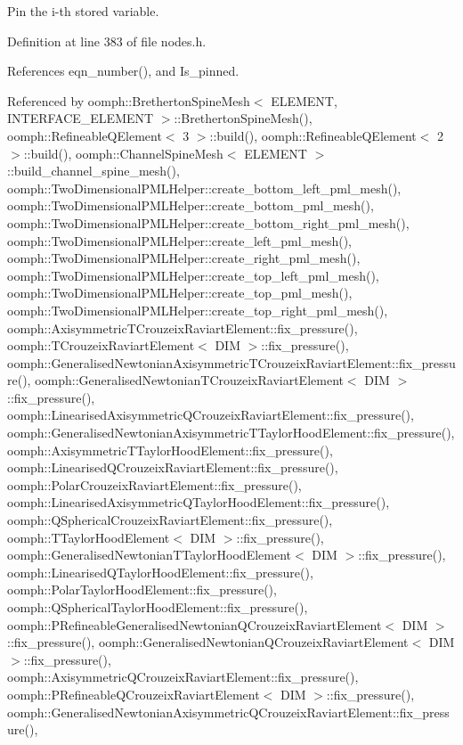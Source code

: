 Pin the i-\/th stored variable. 



Definition at line 383 of file nodes.\+h.



References eqn\+\_\+number(), and Is\+\_\+pinned.



Referenced by oomph\+::\+Bretherton\+Spine\+Mesh$<$ E\+L\+E\+M\+E\+N\+T, I\+N\+T\+E\+R\+F\+A\+C\+E\+\_\+\+E\+L\+E\+M\+E\+N\+T $>$\+::\+Bretherton\+Spine\+Mesh(), oomph\+::\+Refineable\+Q\+Element$<$ 3 $>$\+::build(), oomph\+::\+Refineable\+Q\+Element$<$ 2 $>$\+::build(), oomph\+::\+Channel\+Spine\+Mesh$<$ E\+L\+E\+M\+E\+N\+T $>$\+::build\+\_\+channel\+\_\+spine\+\_\+mesh(), oomph\+::\+Two\+Dimensional\+P\+M\+L\+Helper\+::create\+\_\+bottom\+\_\+left\+\_\+pml\+\_\+mesh(), oomph\+::\+Two\+Dimensional\+P\+M\+L\+Helper\+::create\+\_\+bottom\+\_\+pml\+\_\+mesh(), oomph\+::\+Two\+Dimensional\+P\+M\+L\+Helper\+::create\+\_\+bottom\+\_\+right\+\_\+pml\+\_\+mesh(), oomph\+::\+Two\+Dimensional\+P\+M\+L\+Helper\+::create\+\_\+left\+\_\+pml\+\_\+mesh(), oomph\+::\+Two\+Dimensional\+P\+M\+L\+Helper\+::create\+\_\+right\+\_\+pml\+\_\+mesh(), oomph\+::\+Two\+Dimensional\+P\+M\+L\+Helper\+::create\+\_\+top\+\_\+left\+\_\+pml\+\_\+mesh(), oomph\+::\+Two\+Dimensional\+P\+M\+L\+Helper\+::create\+\_\+top\+\_\+pml\+\_\+mesh(), oomph\+::\+Two\+Dimensional\+P\+M\+L\+Helper\+::create\+\_\+top\+\_\+right\+\_\+pml\+\_\+mesh(), oomph\+::\+Axisymmetric\+T\+Crouzeix\+Raviart\+Element\+::fix\+\_\+pressure(), oomph\+::\+T\+Crouzeix\+Raviart\+Element$<$ D\+I\+M $>$\+::fix\+\_\+pressure(), oomph\+::\+Generalised\+Newtonian\+Axisymmetric\+T\+Crouzeix\+Raviart\+Element\+::fix\+\_\+pressure(), oomph\+::\+Generalised\+Newtonian\+T\+Crouzeix\+Raviart\+Element$<$ D\+I\+M $>$\+::fix\+\_\+pressure(), oomph\+::\+Linearised\+Axisymmetric\+Q\+Crouzeix\+Raviart\+Element\+::fix\+\_\+pressure(), oomph\+::\+Generalised\+Newtonian\+Axisymmetric\+T\+Taylor\+Hood\+Element\+::fix\+\_\+pressure(), oomph\+::\+Axisymmetric\+T\+Taylor\+Hood\+Element\+::fix\+\_\+pressure(), oomph\+::\+Linearised\+Q\+Crouzeix\+Raviart\+Element\+::fix\+\_\+pressure(), oomph\+::\+Polar\+Crouzeix\+Raviart\+Element\+::fix\+\_\+pressure(), oomph\+::\+Linearised\+Axisymmetric\+Q\+Taylor\+Hood\+Element\+::fix\+\_\+pressure(), oomph\+::\+Q\+Spherical\+Crouzeix\+Raviart\+Element\+::fix\+\_\+pressure(), oomph\+::\+T\+Taylor\+Hood\+Element$<$ D\+I\+M $>$\+::fix\+\_\+pressure(), oomph\+::\+Generalised\+Newtonian\+T\+Taylor\+Hood\+Element$<$ D\+I\+M $>$\+::fix\+\_\+pressure(), oomph\+::\+Linearised\+Q\+Taylor\+Hood\+Element\+::fix\+\_\+pressure(), oomph\+::\+Polar\+Taylor\+Hood\+Element\+::fix\+\_\+pressure(), oomph\+::\+Q\+Spherical\+Taylor\+Hood\+Element\+::fix\+\_\+pressure(), oomph\+::\+P\+Refineable\+Generalised\+Newtonian\+Q\+Crouzeix\+Raviart\+Element$<$ D\+I\+M $>$\+::fix\+\_\+pressure(), oomph\+::\+Generalised\+Newtonian\+Q\+Crouzeix\+Raviart\+Element$<$ D\+I\+M $>$\+::fix\+\_\+pressure(), oomph\+::\+Axisymmetric\+Q\+Crouzeix\+Raviart\+Element\+::fix\+\_\+pressure(), oomph\+::\+P\+Refineable\+Q\+Crouzeix\+Raviart\+Element$<$ D\+I\+M $>$\+::fix\+\_\+pressure(), oomph\+::\+Generalised\+Newtonian\+Axisymmetric\+Q\+Crouzeix\+Raviart\+Element\+::fix\+\_\+pressure(), 